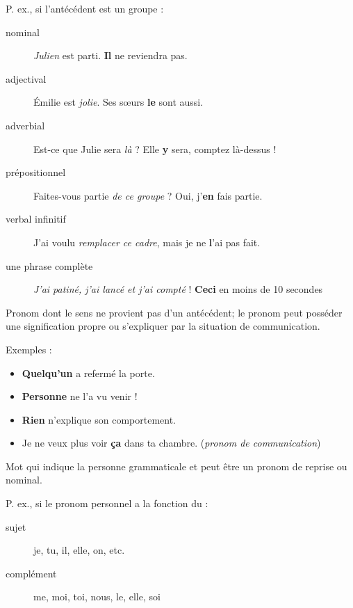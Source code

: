 \documentclass[10pt, french]{article}
\begin{document}
\begin{multicols*}{2}
P. ex., si l'antécédent est un groupe :
\begin{description}
	\item[nominal]	\textit{Julien} est parti. \textbf{Il} ne reviendra pas.
	\item[adjectival]	Émilie est \textit{jolie}. Ses sœurs \textbf{le} sont aussi.
	\item[adverbial]	Est-ce que Julie sera \textit{là} ? Elle \textbf{y} sera, comptez là-dessus ! 
	\item[prépositionnel]	Faites-vous partie \textit{de ce groupe} ? Oui, j'\textbf{en} fais partie.
	\item[verbal infinitif]	J'ai voulu \textit{remplacer ce cadre}, mais je ne \textbf{l}'ai pas fait.
	\item[une phrase complète]	\textit{J'ai patiné, j'ai lancé et j'ai compté} ! \textbf{Ceci} en moins de 10 secondes
\end{description}

\begin{definitionNOHFILLsub}
Pronom dont le sens ne provient pas d'un antécédent; le pronom peut posséder une signification propre ou s'expliquer par la situation de communication.

\tcbline

Exemples :
\begin{itemize}
	\item	\textbf{Quelqu'un} a refermé la porte.
	\item	\textbf{Personne} ne l'a vu venir !
	\item	\textbf{Rien} n'explique son comportement.
	\item	Je ne veux plus voir \textbf{ça} dans ta chambre. (\textit{pronom de communication})
\end{itemize}
\end{definitionNOHFILLsub}

\begin{definitionNOHFILLsub}
Mot qui indique la personne grammaticale et peut être un pronom de reprise ou nominal.

\tcbline

P. ex., si le pronom personnel a la fonction du :
\begin{description}
	\item[sujet]	je, tu, il, elle, on, etc. 
	\item[complément]	me, moi, toi, nous, le, elle, soi 
\end{description}
\end{definitionNOHFILLsub}


\end{multicols*}
\end{document}
